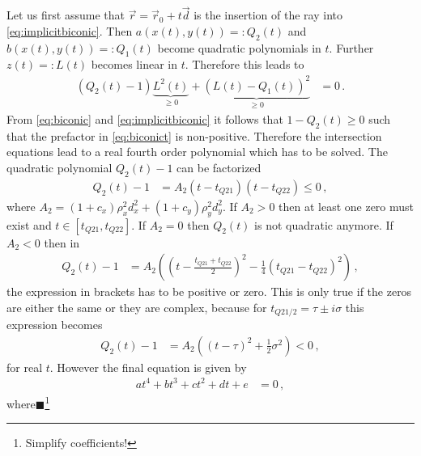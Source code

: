 \documentclass[12pt,a4paper,twoside,openright,BCOR10mm,headsepline,titlepage,abstracton,chapterprefix,final]{scrreprt}
\newcommand{\remark}[1]{{\color{red}$\blacksquare$}\footnote{{\color{red}#1}}}
\begin{document}
Let us first assume that $\vec{r} = \vec{r}_0 + t \vec{d}$ is the insertion of the ray into
\eqref{eq:implicitbiconic}. Then $a(x(t), y(t)) =: Q_2(t)$ and $b(x(t), y(t)) =: Q_1(t)$ become quadratic polynomials 
in $t$. Further $z(t) =: L(t)$ becomes linear in $t$. Therefore this leads to
\begin{align}
 (Q_2(t) - 1) \underbrace{L^2(t)}_{\ge0} + \underbrace{(L(t) - Q_1(t))^2}_{\ge0} &= 0\,.\label{eq:biconict}
\end{align}
From \eqref{eq:biconic} and \eqref{eq:implicitbiconic} it follows that $1 - Q_2(t) \ge 0$ such that the
prefactor in \eqref{eq:biconict} is non-positive. Therefore the intersection equations lead to a real
fourth order polynomial which has to be solved. The quadratic polynomial $Q_2(t) - 1$ can be factorized
\begin{align}
 Q_2(t) - 1 &= A_2 (t - t_{Q21})(t - t_{Q22}) \le 0\,,
\end{align}
where $A_2 = (1 + c_x) \rho_x^2 d_x^2 + (1 + c_y) \rho_y^2 d_y^2$. If $A_2 > 0$ then at least one zero must exist and
$t \in [t_{Q21}, t_{Q22}]$. If $A_2 = 0$ then $Q_2(t)$ is not quadratic anymore. If $A_2 < 0$ then in 
\begin{align}
 Q_2(t) - 1 &= A_2 \left(\left(t-\frac{t_{Q21} + t_{Q22}}{2}\right)^2 - \frac{1}{4}(t_{Q21} - t_{Q22})^2\right)\,,
\end{align}
the expression in brackets has to be positive or zero. This is only true if the zeros are either the same or they are complex, because
for $t_{Q21/2} = \tau \pm i \sigma$ this expression becomes
\begin{align}
 Q_2(t) - 1 &= A_2 \left(\left(t-\tau\right)^2 + \frac{1}{2}\sigma^2\right)<0\,,
\end{align}
for real $t$. However the final equation is given by
\begin{align}
 a t^4 + b t^3 + c t^2 + d t + e &= 0\,,
\end{align}
where\remark{Simplify coefficients!}
\end{document}
